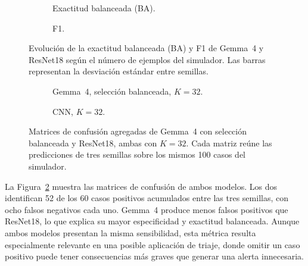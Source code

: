 \begin{figure}[H]
  \centering
  \begin{subfigure}{0.90\textwidth}
    \centering
    \caption{Exactitud balanceada (BA).}
  \end{subfigure}
  \par\medskip
  \begin{subfigure}{0.90\textwidth}
    \centering
    \caption{F1.}
  \end{subfigure}
  \caption{Evolución de la exactitud balanceada (BA) y F1 de Gemma~4 y ResNet18 según el número de ejemplos del simulador. Las barras representan la desviación estándar entre semillas.}
  \label{fig:comparacion_simulador_curvas}
\end{figure}

\begin{figure}[H]
  \centering
    \begin{subfigure}{0.42\textwidth}
    \centering
    \caption{Gemma~4, selección balanceada, \(K=32\).}
  \end{subfigure}
  \hfill
  \begin{subfigure}{0.42\textwidth}
    \centering
    \caption{CNN, \(K=32\).}
  \end{subfigure}
  \caption{Matrices de confusión agregadas de Gemma~4 con selección balanceada y ResNet18, ambas con \(K=32\). Cada matriz reúne las predicciones de tres semillas sobre los mismos 100 casos del simulador.}
  \label{fig:simulator_confusions}
\end{figure}

La Figura~\ref{fig:simulator_confusions} muestra las matrices de confusión de ambos modelos. Los dos identifican 52 de los 60 casos positivos acumulados entre las tres semillas, con ocho falsos negativos cada uno. Gemma~4 produce menos falsos positivos que ResNet18, lo que explica su mayor especificidad y exactitud balanceada. Aunque ambos modelos presentan la misma sensibilidad, esta métrica resulta especialmente relevante en una posible aplicación de triaje, donde omitir un caso positivo puede tener consecuencias más graves que generar una alerta innecesaria.


